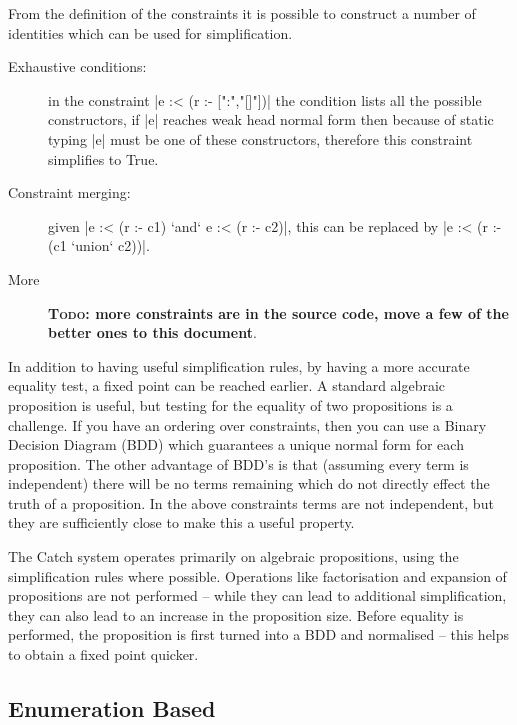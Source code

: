 \documentclass[preprint]{sigplanconf}
\newcommand{\todo}[1]{\textbf{\textsc{Todo:} #1}}
\begin{document}
From the definition of the constraints it is possible to construct a number of identities which can be used for simplification.

\begin{description}
\item[Exhaustive conditions:] in the constraint |e :< (r :- [":","[]"])| the condition lists all the possible constructors, if |e| reaches weak head normal form then because of static typing |e| must be one of these constructors, therefore this constraint simplifies to True.

\item[Constraint merging:] given |e :< (r :- c1) `and` e :< (r :- c2)|, this can be replaced by |e :< (r :- (c1 `union` c2))|.

\item[More] \todo{more constraints are in the source code, move a few of the better ones to this document}.
\end{description}

In addition to having useful simplification rules, by having a more accurate equality test, a fixed point can be reached earlier. A standard algebraic proposition is useful, but testing for the equality of two propositions is a challenge. If you have an ordering over constraints, then you can use a Binary Decision Diagram (BDD) which guarantees a unique normal form for each proposition. The other advantage of BDD's is that (assuming every term is independent) there will be no terms remaining which do not directly effect the truth of a proposition. In the above constraints terms are not independent, but they are sufficiently close to make this a useful property.

The Catch system operates primarily on algebraic propositions, using the simplification rules where possible. Operations like factorisation and expansion of propositions are not performed -- while they can lead to additional simplification, they can also lead to an increase in the proposition size. Before equality is performed, the proposition is first turned into a BDD and normalised -- this helps to obtain a fixed point quicker.

\subsection{Enumeration Based}
\end{document}
